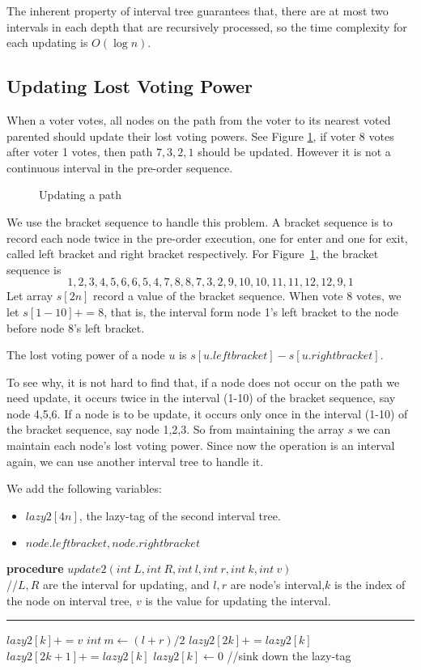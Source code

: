 The inherent property of interval tree guarantees that, there are at most two intervals in each depth that are recursively processed, so the time complexity for each updating is $O(\log n)$.

\subsection{Updating Lost Voting Power}
When a voter votes, all nodes on the path from the voter to its nearest voted parented should update their lost voting powers. See Figure \ref{fig:2}, if voter 8 votes after voter 1 votes, then path $7,3,2,1$ should be updated. However it is not a continuous interval in the pre-order sequence.
\begin{figure}
  \centering
  
	\caption{Updating a path}
	\label{fig:2}
\end{figure}
We use the bracket sequence to handle this problem. A bracket sequence is to
record each node twice in the pre-order execution, one for enter and one for
exit, called left bracket and right bracket respectively. For Figure~\ref{fig:2}, the bracket sequence is
$$1,2,3,4,5,6,6,5,4,7,8,8,7,3,2,9,10,10,11,11,12,12,9,1$$
Let array $s[2n]$ record a value of the bracket sequence. When vote 8 votes, we let $s[1-10]+=8$, that is, the interval form node 1's left bracket to the node before node 8's left bracket.

The lost voting power of a node $u$ is $s[u.leftbracket]-s[u.rightbracket]$.

To see why, it is not hard to find that, if a node does not occur on the path we need update, it occurs twice in the interval (1-10) of the bracket sequence, say node 4,5,6. If a node is to be update, it occurs only once in the interval  (1-10) of the bracket sequence, say node 1,2,3. So from maintaining the array $s$ we can maintain each node's lost voting power. Since now the operation is an interval again, we can use another interval tree to handle it.

We add the following variables:
\begin{itemize}
\item $lazy2[4n]$, the lazy-tag of the second interval tree.
\item $node.leftbracket,node.rightbracket$
\end{itemize}

\begin{algorithm}
	\textbf{procedure} $update2(int~L,int ~R, int~l, int~r, int~k, int~v)${\color{gray}
		\\//$L,R$ are the interval for updating, and $l,r$ are node's interval,$k$ is the index of the node on interval tree, $v$ is the value for updating the interval.}
	\hrule
	{
       $lazy2[k]+=v$
	}
	{
		$int~m \leftarrow (l+r)/2$\;
		$lazy2[2k] += lazy2[k]$\;
		$lazy2[2k+1]+= lazy2[k]$\;
		$lazy2[k] \leftarrow 0$
			{\color{gray}
		//sink down the lazy-tag}\;
    }
\end{algorithm}
